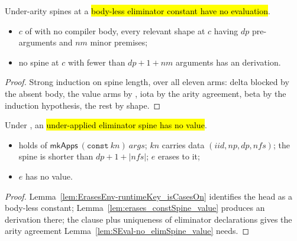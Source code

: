\begin{lemma}
\label{lem:SEval-no_elimSpine_value}
\leanok
{}
 Under-arity spines at a \hl{body-less eliminator constant have no evaluation}.
\begin{itemize}
\item {} $c$ of  with no compiler body, every relevant  shape at
$c$ having $dp$ pre-arguments and $nm$ minor premises;
\item {} no spine at $c$ with fewer than $dp + 1 + nm$ arguments has an \SEval{} derivation.
\end{itemize}
\end{lemma}
\begin{proof}
\leanok
{}
 Strong induction on spine length, over all eleven \SEval{} arms: delta blocked by the absent
body, the value arms by , iota by the arity agreement, beta by the induction
hypothesis, the rest by shape.
\end{proof}

\begin{proposition}
\label{prop:erases_elimSpine_no_value}
\leanok
{}
 Under , an \hl{under-applied eliminator spine has no value}.
\begin{itemize}
\item {} \ErasesEnv{} holds of $\mathsf{mkApps}\ (\mathtt{const}\ kn)\ args$; $kn$ carries
 data $(iid, np, dp, nfs)$; the spine is shorter than $dp + 1 + |nfs|$; $e$ erases to it;
\item {} $e$ has no \SEval{} value.
\end{itemize}
\end{proposition}
\begin{proof}
\leanok
{}
 Lemma~\ref{lem:ErasesEnv-runtimeKey_isCasesOn} identifies the head as a body-less
 constant; Lemma~\ref{lem:erases_constSpine_value} produces an \SEval{} derivation there;
the  clause plus uniqueness of eliminator declarations gives the arity agreement
Lemma~\ref{lem:SEval-no_elimSpine_value} needs.
\end{proof}

